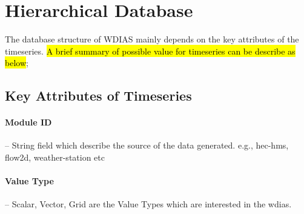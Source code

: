 \section{Hierarchical Database}

The database structure of WDIAS mainly depends on the key attributes of the timeseries. \hl{A brief summary of possible value for timeseries can be describe as below};

\subsection{Key Attributes of Timeseries}
\label{subse:timeseries_key_attributes}
\paragraph{Module ID}-- String field which describe the source of the data generated. e.g., hec-hms, flow2d, weather-station etc

\paragraph{Value Type}-- Scalar, Vector, Grid are the Value Types which are interested in the \acrshort{wdias}.

